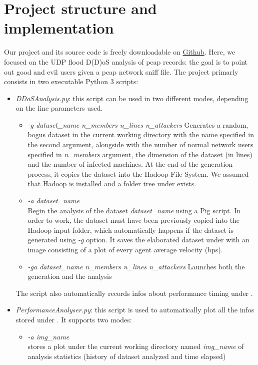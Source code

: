 \section{Project structure and implementation}
Our project and its source code is freely downloadable on \href{https://github.com/CristianTuretta/DDoS-Network-Flow-Forensics-Analyser-.git}{Github}. Here, we focused on the UDP flood D(D)oS analysis of pcap records: the goal is to point out good and evil users given a pcap network sniff file. The project primarly consists in two executable Python 3 scripts:
\begin{itemize}
	\item{\textit{DDoSAnalysis.py}}: this script can be used in two different modes, depending on the line parameters used. 
		\begin{itemize}
			\item \textit{-g dataset\_name n\_members n\_lines n\_attackers} Generates a random, bogus dataset in the current working directory with the name specified in the second argument, alongside with the number of normal network users specified in \textit{n\_members} argument, the dimension of the dataset (in lines) and the number of infected machines. At the end of the generation process, it copies the dataset into the Hadoop File System. We assumed that Hadoop is installed and a folder tree under  exists.
			\item \textit{-a dataset\_name} \\Begin the analysis of the dataset \textit{dataset\_name} using a Pig script. In order to work, the dataset must have been previously copied into the Hadoop input folder, which automatically happens if the dataset is generated using \textit{-g} option. It saves the elaborated dataset under  with an image consisting of a plot of every agent average velocity (bps).
			\item \textit{-ga dataset\_name n\_members n\_lines n\_attackers} Launches both the generation and the analysis 
		\end{itemize}
		The script also automatically records infos about performance timing under .
		\pagebreak
		\item{\textit{PerformanceAnalyser.py}}: this script is used to automatically plot all the infos stored under  . It supports two modes:
			\begin{itemize}
				\item \textit{-a img\_name} \\ stores a plot under the current working directory named \textit{img\_name} of analysis statistics (history of dataset analyzed and time elapsed)

\end{itemize}
\end{itemize}
